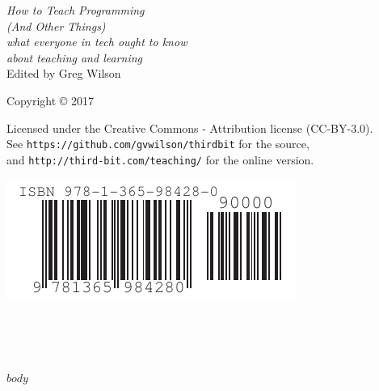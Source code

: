 \documentclass[10pt,statementpaper]{memoir}
\begin{document}
\pagestyle{empty}

{\begingroup
  \raggedleft
  \vspace*{\baselineskip}

  {\Huge\itshape How to Teach Programming \\ (And Other Things)}\\[\baselineskip]

  {\large\itshape
    what everyone in tech ought to know\\ about teaching and learning
  }\\[0.2\textheight]

  {\large Edited by Greg Wilson}\par

  \vfill

  {\large Copyright {\copyright} 2017}

  \vspace*{\baselineskip}

  {\small
    Licensed under the Creative Commons - Attribution license (CC-BY-3.0).
    \\
    See \texttt{https://github.com/gvwilson/thirdbit} for the source,\\
    and \texttt{http://third-bit.com/teaching/} for the online version.
  }

  \vspace*{4\baselineskip}

  \includegraphics{isbn-barcode.pdf}

\endgroup}

\newpage

\pagestyle{empty}

~

\newpage

\tableofcontents

\newpage

\pagestyle{empty}

~

\newpage

\pagestyle{plain}

$body$
\end{document}
